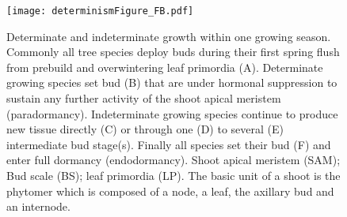 \documentclass{article}
\begin{document}
								\begin{figure}
								\centering
								\texttt{[image: determinismFigure\_FB.pdf]} 
								\caption{Determinate and indeterminate growth within one growing season. Commonly all tree species deploy buds during their first spring flush from prebuild and overwintering leaf primordia (A). Determinate growing species set bud (B) that are under hormonal suppression to sustain any further activity of the shoot apical meristem (paradormancy). Indeterminate growing species continue to produce new tissue directly (C) or through one (D) to several (E) intermediate bud stage(s). Finally all species set their bud (F) and enter full dormancy (endodormancy). Shoot apical meristem (SAM); Bud scale (BS); leaf primordia (LP). The basic unit of a shoot is the phytomer which is composed of a node, a leaf, the axillary bud and an internode.}
								\label{fig:fig_2xxx}
								\end{figure}
		
\end{document}
